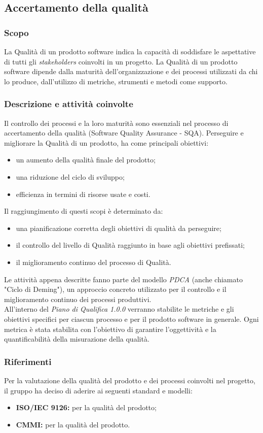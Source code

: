 \subsection{Accertamento della qualit\` a}
\subsubsection{Scopo}
La Qualità di un prodotto software indica la capacità di soddisfare le aspettative
di tutti gli \textit{stakeholders\glo} coinvolti in un progetto.
La Qualità di un prodotto software dipende dalla maturità dell'organizzazione e
dei processi utilizzati da chi lo produce, dall'utilizzo di metriche, strumenti
e metodi come supporto.


\subsubsection{Descrizione e attività coinvolte}
Il controllo dei processi e la loro maturità sono essenziali nel processo di
accertamento della qualità (Software Quality Assurance - SQA).
Perseguire e migliorare la Qualità di un prodotto, ha come principali obiettivi:
\begin{itemize}
	\item un aumento della qualità finale del prodotto;
	\item una riduzione del ciclo di sviluppo;
	\item efficienza in termini di risorse usate e costi.
\end{itemize}
Il raggiungimento di questi scopi è determinato da:
\begin{itemize}
	\item una pianificazione corretta degli obiettivi di qualità da perseguire;
	\item il controllo del livello di Qualità raggiunto in base agli obiettivi prefissati;
	\item il miglioramento continuo del processo di Qualità.
\end{itemize}
Le attività appena descritte fanno parte del modello
\textit{PDCA\glo} (anche chiamato "Ciclo di Deming"), un approccio concreto
utilizzato per il controllo e il miglioramento continuo dei processi produttivi.\\
All'interno del \textit{Piano di Qualifica 1.0.0\doc} verranno stabilite
le metriche e gli obiettivi specifici per ciascun processo e per il prodotto
software in generale. Ogni metrica è stata stabilita con l'obiettivo di garantire
l'oggettività e la quantificabilità della misurazione della qualità.

\subsubsection{Riferimenti}
Per la valutazione della qualità del prodotto e dei processi coinvolti nel progetto,
il gruppo ha deciso di aderire ai seguenti standard e modelli:
\begin{itemize}
	\item \textbf{ISO/IEC 9126:} per la qualità del prodotto;
	\item \textbf{CMMI:} per la qualità del prodotto.
\end{itemize}
